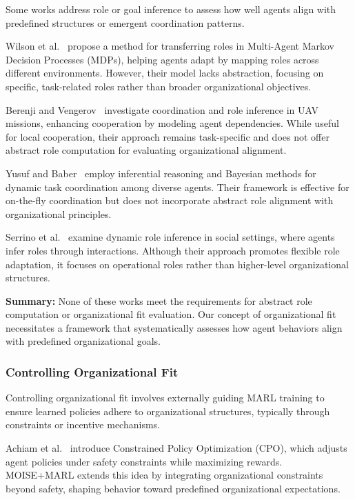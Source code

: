 \documentclass[pdflatex,sn-mathphys-num]{sn-jnl}%
\theoremstyle{thmstyleone}%
\theoremstyle{thmstyletwo}%
\theoremstyle{thmstylethree}%
\begin{document}
Some works address role or goal inference to assess how well agents align with predefined structures or emergent coordination patterns.

Wilson et al.~\cite{wilson2008learning} propose a method for transferring roles in Multi-Agent Markov Decision Processes (MDPs), helping agents adapt by mapping roles across different environments. However, their model lacks abstraction, focusing on specific, task-related roles rather than broader organizational objectives.

Berenji and Vengerov~\cite{berenji2000learning} investigate coordination and role inference in UAV missions, enhancing cooperation by modeling agent dependencies. While useful for local cooperation, their approach remains task-specific and does not offer abstract role computation for evaluating organizational alignment.

Yusuf and Baber~\cite{yusuf2020inferential} employ inferential reasoning and Bayesian methods for dynamic task coordination among diverse agents. Their framework is effective for on-the-fly coordination but does not incorporate abstract role alignment with organizational principles.

Serrino et al.~\cite{serrino2019finding} examine dynamic role inference in social settings, where agents infer roles through interactions. Although their approach promotes flexible role adaptation, it focuses on operational roles rather than higher-level organizational structures.

\medskip

\noindent \textbf{Summary:} None of these works meet the requirements for abstract role computation or organizational fit evaluation. Our concept of organizational fit necessitates a framework that systematically assesses how agent behaviors align with predefined organizational goals.

\subsubsection{Controlling Organizational Fit}

Controlling organizational fit involves externally guiding MARL training to ensure learned policies adhere to organizational structures, typically through constraints or incentive mechanisms.

Achiam et al.~\cite{achiam2017cpo} introduce Constrained Policy Optimization (CPO), which adjusts agent policies under safety constraints while maximizing rewards. MOISE+MARL extends this idea by integrating organizational constraints beyond safety, shaping behavior toward predefined organizational expectations.
\end{document}
